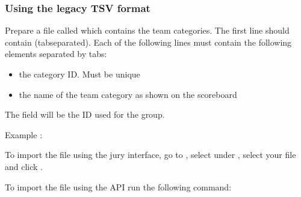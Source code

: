 \documentclass[a4paper,10pt,english,openany]{sphinxmanual}
\begin{document}
\begin{sphinxVerbatim}[commandchars=\\\{\}]
      
\end{sphinxVerbatim}


\subsubsection{Using the legacy TSV format}
\label{\detokenize{import:using-the-legacy-tsv-format}}
\sphinxAtStartPar
Prepare a file called  which contains the team categories.
The first line should contain  (tab\sphinxhyphen{}separated).
Each of the following lines must contain the following elements separated by tabs:
\begin{itemize}
\item {} 
\sphinxAtStartPar
the category ID. Must be unique

\item {} 
\sphinxAtStartPar
the name of the team category as shown on the scoreboard

\end{itemize}

\sphinxAtStartPar
The  field will be the ID used for the group.

\sphinxAtStartPar
Example :

\begin{sphinxVerbatim}[commandchars=\\\{\}]
   
        
   
   
\end{sphinxVerbatim}

\sphinxAtStartPar
To import the file using the jury interface, go to , select
 under , select your file and click .

\sphinxAtStartPar
To import the file using the API run the following command:
\end{document}
